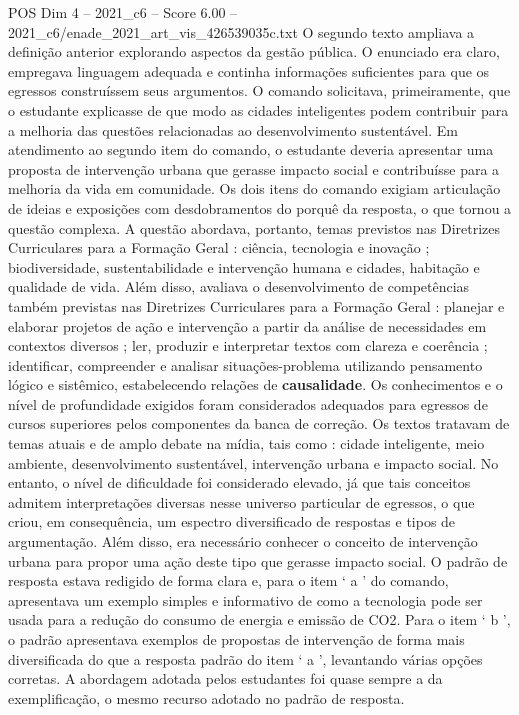 \begin{textsample}{POS Dim 4 – 2021\_c6 – Score 6.00 – 2021\_c6/enade\_2021\_art\_vis\_426539035c.txt}
O segundo texto ampliava a definição anterior explorando aspectos da gestão pública.
O enunciado era claro, empregava linguagem adequada e continha informações suficientes para que os egressos construíssem seus argumentos.
O comando solicitava, primeiramente, que o estudante explicasse de que modo as cidades inteligentes podem contribuir para a melhoria das questões relacionadas ao desenvolvimento sustentável.
Em atendimento ao segundo item do comando, o estudante deveria apresentar uma proposta de intervenção urbana que gerasse impacto social e contribuísse para a melhoria da vida em comunidade.
Os dois itens do comando exigiam articulação de ideias e exposições com desdobramentos do porquê da resposta, o que tornou a questão complexa.
A questão abordava, portanto, temas previstos nas Diretrizes Curriculares para a Formação Geral : ciência, tecnologia e inovação ; biodiversidade, sustentabilidade e intervenção humana e cidades, habitação e qualidade de vida.
Além disso, avaliava o desenvolvimento de competências também previstas nas Diretrizes Curriculares para a Formação Geral : planejar e elaborar projetos de ação e intervenção a partir da análise de necessidades em contextos diversos ; ler, produzir e interpretar textos com clareza e coerência ; identificar, compreender e analisar situações-problema utilizando pensamento lógico e sistêmico, estabelecendo relações de \textbf{causalidade}.
Os conhecimentos e o nível de profundidade exigidos foram considerados adequados para egressos de cursos superiores pelos componentes da banca de correção.
Os textos tratavam de temas atuais e de amplo debate na mídia, tais como : cidade inteligente, meio ambiente, desenvolvimento sustentável, intervenção urbana e impacto social.
No entanto, o nível de dificuldade foi considerado elevado, já que tais conceitos admitem interpretações diversas nesse universo particular de egressos, o que criou, em consequência, um espectro diversificado de respostas e tipos de argumentação.
Além disso, era necessário conhecer o conceito de intervenção urbana para propor uma ação deste tipo que gerasse impacto social.
O padrão de resposta estava redigido de forma clara e, para o item ‘ a ’ do comando, apresentava um exemplo simples e informativo de como a tecnologia pode ser usada para a redução do consumo de energia e emissão de CO2.
Para o item ‘ b ’, o padrão apresentava exemplos de propostas de intervenção de forma mais diversificada do que a resposta padrão do item ‘ a ’, levantando várias opções corretas.
A abordagem adotada pelos estudantes foi quase sempre a da exemplificação, o mesmo recurso adotado no padrão de resposta.

\end{textsample}
